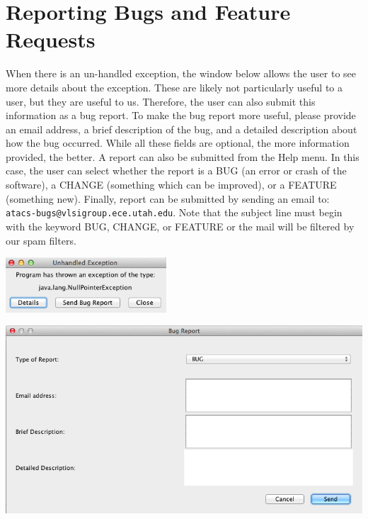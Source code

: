 \documentclass[titlepage,11pt]{article}
\begin{document}
\section{Reporting Bugs and Feature Requests}

\noindent
When there is an un-handled exception, the window below allows the user to see more details about the exception.  These are likely not particularly useful to a user, but they are useful to us.  Therefore, the user can also submit this information as a bug report.  To make the bug report more useful, please provide an email address, a brief description of the bug, and a detailed description about how the bug occurred.  While all these fields are optional, the more information provided, the better.  A report can also be submitted from the Help menu.  In this case, the user can select whether the report is a BUG (an error or crash of the software), a CHANGE (something which can be improved), or a FEATURE (something new).  Finally, report can be submitted by sending an email to:\\ 
{\tt atacs-bugs@vlsigroup.ece.utah.edu}.
Note that the subject line must begin with the keyword BUG, CHANGE, or FEATURE or the
mail will be filtered by our spam filters.

\begin{center}
\includegraphics[width=60mm]{screenshots/exception}
\end{center}

\begin{center}
\includegraphics[width=160mm]{screenshots/bugReport}
\end{center}
\end{document}
